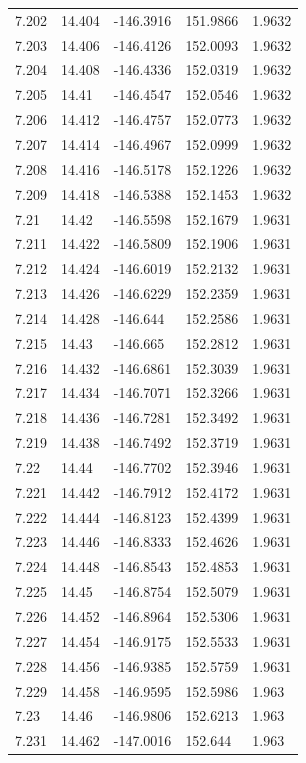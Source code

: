 \begin{tabular}{lllll}
7.202 & 14.404 & -146.3916 & 151.9866 & 1.9632 \\
7.203 & 14.406 & -146.4126 & 152.0093 & 1.9632 \\
7.204 & 14.408 & -146.4336 & 152.0319 & 1.9632 \\
7.205 & 14.41 & -146.4547 & 152.0546 & 1.9632 \\
7.206 & 14.412 & -146.4757 & 152.0773 & 1.9632 \\
7.207 & 14.414 & -146.4967 & 152.0999 & 1.9632 \\
7.208 & 14.416 & -146.5178 & 152.1226 & 1.9632 \\
7.209 & 14.418 & -146.5388 & 152.1453 & 1.9632 \\
7.21 & 14.42 & -146.5598 & 152.1679 & 1.9631 \\
7.211 & 14.422 & -146.5809 & 152.1906 & 1.9631 \\
7.212 & 14.424 & -146.6019 & 152.2132 & 1.9631 \\
7.213 & 14.426 & -146.6229 & 152.2359 & 1.9631 \\
7.214 & 14.428 & -146.644 & 152.2586 & 1.9631 \\
7.215 & 14.43 & -146.665 & 152.2812 & 1.9631 \\
7.216 & 14.432 & -146.6861 & 152.3039 & 1.9631 \\
7.217 & 14.434 & -146.7071 & 152.3266 & 1.9631 \\
7.218 & 14.436 & -146.7281 & 152.3492 & 1.9631 \\
7.219 & 14.438 & -146.7492 & 152.3719 & 1.9631 \\
7.22 & 14.44 & -146.7702 & 152.3946 & 1.9631 \\
7.221 & 14.442 & -146.7912 & 152.4172 & 1.9631 \\
7.222 & 14.444 & -146.8123 & 152.4399 & 1.9631 \\
7.223 & 14.446 & -146.8333 & 152.4626 & 1.9631 \\
7.224 & 14.448 & -146.8543 & 152.4853 & 1.9631 \\
7.225 & 14.45 & -146.8754 & 152.5079 & 1.9631 \\
7.226 & 14.452 & -146.8964 & 152.5306 & 1.9631 \\
7.227 & 14.454 & -146.9175 & 152.5533 & 1.9631 \\
7.228 & 14.456 & -146.9385 & 152.5759 & 1.9631 \\
7.229 & 14.458 & -146.9595 & 152.5986 & 1.963 \\
7.23 & 14.46 & -146.9806 & 152.6213 & 1.963 \\
7.231 & 14.462 & -147.0016 & 152.644 & 1.963 \\

\end{tabular}
